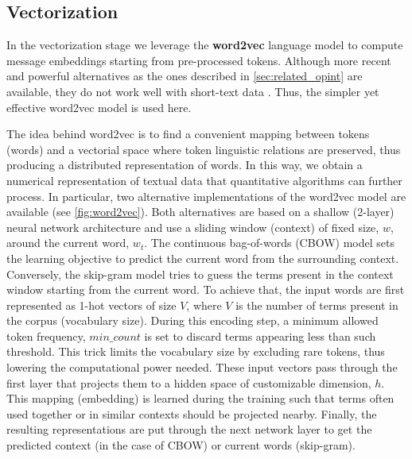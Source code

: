 \subsection{Vectorization} \label{sec:vectorization}

In the vectorization stage we leverage the \textbf{word2vec} language model \cite{mikolov2013word2vec} to compute message embeddings starting from pre-processed tokens.
Although more recent and powerful alternatives as the ones described in \cref{sec:related_opint} are available, they do not work well with short-text data \cite{albalawi2020short-text}. Thus, the simpler yet effective word2vec model is used here.

The idea behind word2vec is to find a convenient mapping between tokens (words) and a vectorial space where token linguistic relations are preserved, thus producing a distributed representation of words.
In this way, we obtain a numerical representation of textual data that quantitative algorithms can further process.
In particular, two alternative implementations of the word2vec model are available (see \cref{fig:word2vec}).
Both alternatives are based on a shallow (2-layer) neural network architecture and use a sliding window (context) of fixed size, $w$, around the current word, $w_t$.
The continuous bag-of-words (CBOW) model sets the learning objective to predict the current word from the surrounding context.
Conversely, the \mbox{skip-gram} model tries to guess the terms present in the context window starting from the current word.
To achieve that, the input words are first represented as 1-hot vectors of size $V$, where $V$ is the number of terms present in the corpus (vocabulary size). 
During this encoding step, a minimum allowed token frequency, $min\_count$ is set to discard terms appearing less than such threshold. This trick limits the vocabulary size by excluding rare tokens, thus lowering the computational power needed.
These input vectors pass through the first layer that projects them to a hidden space of customizable dimension, $h$. This mapping (embedding) is learned during the training such that terms often used together or in similar contexts should be projected nearby.
Finally, the resulting representations are put through the next network layer to get the predicted context (in the case of CBOW) or current words (skip-gram).

